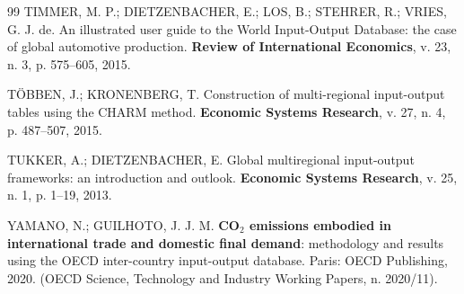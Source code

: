 \documentclass[11pt,a4paper]{article}
\begin{document}
\begin{thebibliography}{99}
TIMMER, M. P.; DIETZENBACHER, E.; LOS, B.; STEHRER, R.; VRIES, G. J. de. An
illustrated user guide to the World Input-Output Database: the case of global
automotive production. \textbf{Review of International Economics}, v. 23,
n. 3, p. 575--605, 2015.

TÖBBEN, J.; KRONENBERG, T. Construction of multi-regional input-output tables
using the CHARM method. \textbf{Economic Systems Research}, v. 27, n. 4,
p. 487--507, 2015.

TUKKER, A.; DIETZENBACHER, E. Global multiregional input-output frameworks: an
introduction and outlook. \textbf{Economic Systems Research}, v. 25, n. 1,
p. 1--19, 2013.

YAMANO, N.; GUILHOTO, J. J. M. \textbf{CO$_2$ emissions embodied in
international trade and domestic final demand}: methodology and results using
the OECD inter-country input-output database. Paris: OECD Publishing, 2020.
(OECD Science, Technology and Industry Working Papers, n. 2020/11).

\end{thebibliography}
\end{document}
